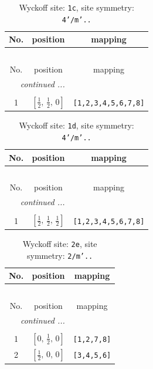 \documentclass[fleqn,8pt]{jsarticle}
\begin{document}
\begin{longtable}{ccc}
\caption{Wyckoff site: {\tt 1c}, site symmetry: {\tt 4'/m'..}}
 \\
 \hline \hline
No. & position & mapping \\ \hline \endfirsthead

\multicolumn{2}{l}{\tablename\ \thetable{}} \\
 \hline \hline
No. & position & mapping \\ \hline \endhead

 \hline \hline
\multicolumn{2}{r}{\footnotesize\it continued ...} \\ \endfoot

 \hline \hline
\multicolumn{2}{r}{} \\ \endlastfoot

1 & $\left[ \frac{1}{2},\, \frac{1}{2},\, 0 \right]$ & {\tt [1,2,3,4,5,6,7,8]} \\
\end{longtable}
\renewcommand{\arraystretch}{1.2}
\begin{longtable}{ccc}
\caption{Wyckoff site: {\tt 1d}, site symmetry: {\tt 4'/m'..}}
 \\
 \hline \hline
No. & position & mapping \\ \hline \endfirsthead

\multicolumn{2}{l}{\tablename\ \thetable{}} \\
 \hline \hline
No. & position & mapping \\ \hline \endhead

 \hline \hline
\multicolumn{2}{r}{\footnotesize\it continued ...} \\ \endfoot

 \hline \hline
\multicolumn{2}{r}{} \\ \endlastfoot

1 & $\left[ \frac{1}{2},\, \frac{1}{2},\, \frac{1}{2} \right]$ & {\tt [1,2,3,4,5,6,7,8]} \\
\end{longtable}
\renewcommand{\arraystretch}{1.2}
\begin{longtable}{ccc}
\caption{Wyckoff site: {\tt 2e}, site symmetry: {\tt 2/m'..}}
 \\
 \hline \hline
No. & position & mapping \\ \hline \endfirsthead

\multicolumn{2}{l}{\tablename\ \thetable{}} \\
 \hline \hline
No. & position & mapping \\ \hline \endhead

 \hline \hline
\multicolumn{2}{r}{\footnotesize\it continued ...} \\ \endfoot

 \hline \hline
\multicolumn{2}{r}{} \\ \endlastfoot

1 & $\left[ 0,\, \frac{1}{2},\, 0 \right]$ & {\tt [1,2,7,8]} \\ \hline
2 & $\left[ \frac{1}{2},\, 0,\, 0 \right]$ & {\tt [3,4,5,6]} \\
\end{longtable}
\end{document}
